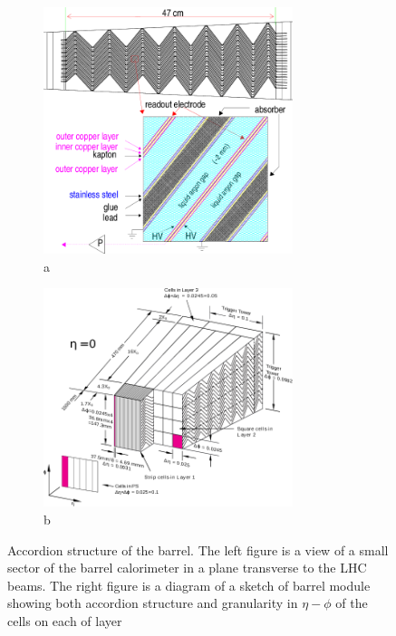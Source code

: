 \begin{figure}[htbp!]
\begin{subfigure}{.5\textwidth}
 \centering
 \includegraphics[width=0.8\textwidth]{chapters/c4/figures/lar-layers}
 \caption{a}
 \label{fig:lar1}
\end{subfigure}%
\begin{subfigure}{.5\textwidth}
 \centering
 \includegraphics[width=0.8\textwidth]{chapters/c4/figures/lar}
 \caption{b}
 \label{fig:lar2}
\end{subfigure}
 \caption{Accordion structure of the barrel. The left figure is a view of a small sector of the barrel calorimeter in a plane transverse to the LHC beams. The right figure is a diagram of a sketch of barrel module showing both accordion structure and granularity in $\eta - \phi$ of the cells on each of layer}
 \label{fig:pixel}
\end{figure}

